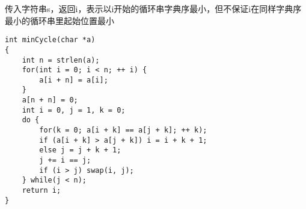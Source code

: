 传入字符串s，返回i，表示以i开始的循环串字典序最小，但不保证i在同样字典序最小的循环串里起始位置最小
\begin{lstlisting}
int minCycle(char *a)
{
	int n = strlen(a);
	for(int i = 0; i < n; ++ i) {
		a[i + n] = a[i];
	}
	a[n + n] = 0;
	int i = 0, j = 1, k = 0;
	do {
		for(k = 0; a[i + k] == a[j + k]; ++ k);
		if (a[i + k] > a[j + k]) i = i + k + 1;
		else j = j + k + 1;
		j += i == j;
		if (i > j) swap(i, j);
	} while(j < n);
	return i;
}
\end{lstlisting}
